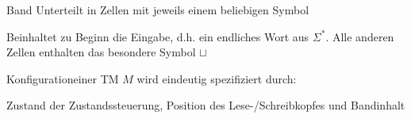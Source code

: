 \begin{definition}{Band} Unterteilt in Zellen mit jeweils einem beliebigen Symbol
    
    Beinhaltet zu Beginn die Eingabe, d.h. ein endliches Wort aus $\Sigma^{*}$. Alle anderen Zellen enthalten das besondere Symbol $\sqcup$
\end{definition}

\begin{definition}{Konfiguration}einer TM $M$ wird eindeutig spezifiziert durch:

    Zustand der Zustandssteuerung, Position des Lese-/Schreibkopfes und Bandinhalt
\end{definition}






